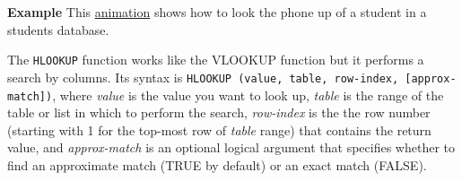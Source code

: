 \textbf{Example} This \href{http://aprendeconalf.es/office/excel/manual/img/example_function_vlookup.gif}{animation} shows how to look the phone up of a student in a students database.

The \texttt{HLOOKUP} function works like the VLOOKUP function but it performs a search by columns. Its syntax is \texttt{HLOOKUP (value, table, row-index, [approx-match])}, where \emph{value} is the value you want to look up, \emph{table} is the range of the table or list in which to perform the search, \emph{row-index} is the the row number (starting with 1 for the top-most row of \emph{table} range) that contains the return value, and \emph{approx-match} is an optional logical argument that specifies whether to find an approximate match (TRUE by default) or an exact match (FALSE).

